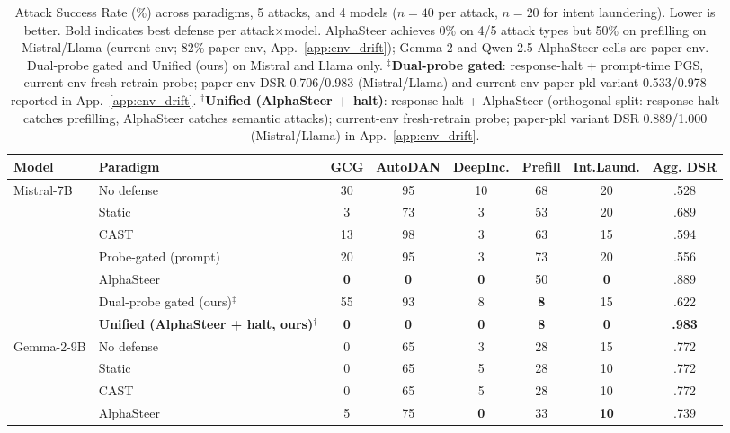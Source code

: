 \documentclass{article}
\begin{document}
\begin{table}[t]
\caption{Attack Success Rate (\%) across paradigms, 5 attacks, and 4 models ($n=40$ per attack, $n=20$ for intent laundering). Lower is better. Bold indicates best defense per attack$\times$model. AlphaSteer achieves 0\% on 4/5 attack types but 50\% on prefilling on Mistral/Llama (current env; 82\% paper env, App.~\ref{app:env_drift}); Gemma-2 and Qwen-2.5 AlphaSteer cells are paper-env. Dual-probe gated and Unified (ours) on Mistral and Llama only. $^{\ddagger}$\textbf{Dual-probe gated}: response-halt + prompt-time PGS, current-env fresh-retrain probe; paper-env DSR 0.706/0.983 (Mistral/Llama) and current-env paper-pkl variant 0.533/0.978 reported in App.~\ref{app:env_drift}. $^{\dagger}$\textbf{Unified (AlphaSteer + halt)}: response-halt + AlphaSteer (orthogonal split: response-halt catches prefilling, AlphaSteer catches semantic attacks); current-env fresh-retrain probe; paper-pkl variant DSR 0.889/1.000 (Mistral/Llama) in App.~\ref{app:env_drift}.}
\label{tab:main}
\centering
\small
\begin{adjustbox}{max width=\textwidth}
\begin{tabular}{ll ccccc c}
\toprule
\textbf{Model} & \textbf{Paradigm} & \textbf{GCG} & \textbf{AutoDAN} & \textbf{DeepInc.} & \textbf{Prefill} & \textbf{Int.Laund.} & \textbf{Agg. DSR} \\
\midrule
\multirow{7}{*}{Mistral-7B}
 & No defense   & 30 & 95  & 10 & 68 & 20 & .528 \\
 & Static       & 3  & 73  & 3  & 53 & 20 & .689 \\
 & CAST         & 13 & 98  & 3  & 63 & 15 & .594 \\
 & Probe-gated (prompt) & 20 & 95 & 3 & 73 & 20 & .556 \\
 & AlphaSteer   & \textbf{0}  & \textbf{0}   & \textbf{0}  & 50 & \textbf{0}  & .889 \\
 & Dual-probe gated (ours)$^{\ddagger}$ & 55 & 93 & 8 & \textbf{8} & 15 & .622 \\
 & \textbf{Unified (AlphaSteer + halt, ours)}$^{\dagger}$ & \textbf{0}  & \textbf{0}   & \textbf{0}  & \textbf{8} & \textbf{0}  & \textbf{.983} \\
\midrule
\multirow{5}{*}{Gemma-2-9B}
 & No defense   & 0  & 65  & 3  & 28 & 15 & .772 \\
 & Static       & 0  & 65  & 5  & 28 & 10 & .772 \\
 & CAST         & 0  & 65  & 5  & 28 & 10 & .772 \\
 & AlphaSteer   & 5  & 75  & \textbf{0}  & 33 & \textbf{10} & .739 \\

\end{tabular}
\end{adjustbox}
\end{table}
\end{document}
